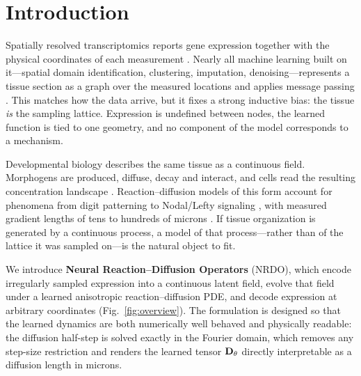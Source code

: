 \section{Introduction}

Spatially resolved transcriptomics reports gene expression together with the
physical coordinates of each measurement \citep{stahl2016visium,chen2015merfish}.
Nearly all machine learning built on it---spatial domain identification,
clustering, imputation, denoising---represents a tissue section as a graph over
the measured locations and applies message passing
\citep{hu2021spagcn,dong2022stagate,palla2022squidpy}. This matches how the data
arrive, but it fixes a strong inductive bias: the tissue \emph{is} the sampling
lattice. Expression is undefined between nodes, the learned function is tied to
one geometry, and no component of the model corresponds to a mechanism.

Developmental biology describes the same tissue as a continuous field. Morphogens
are produced, diffuse, decay and interact, and cells read the resulting
concentration landscape \citep{turing1952,wolpert1969positional,gierer1972theory}.
Reaction--diffusion models of this form account for phenomena from digit
patterning \citep{sheth2012hox} to Nodal/Lefty signaling \citep{muller2013nodal},
with measured gradient lengths of tens to hundreds of microns
\citep{kicheva2007kinetics,yu2009fgf8}. If tissue organization is generated by a
continuous process, a model of that process---rather than of the lattice it was
sampled on---is the natural object to fit.

We introduce \textbf{Neural Reaction--Diffusion Operators} (NRDO), which encode irregularly
sampled expression into a continuous latent field, evolve that field under a
learned anisotropic reaction--diffusion PDE, and decode expression at arbitrary
coordinates (Fig.~\ref{fig:overview}). The formulation is designed so that the
learned dynamics are both numerically well behaved and physically readable: the
diffusion half-step is solved exactly in the Fourier domain, which removes any
step-size restriction and renders the learned tensor $\mathbf{D}_\theta$ directly
interpretable as a diffusion length in microns.

